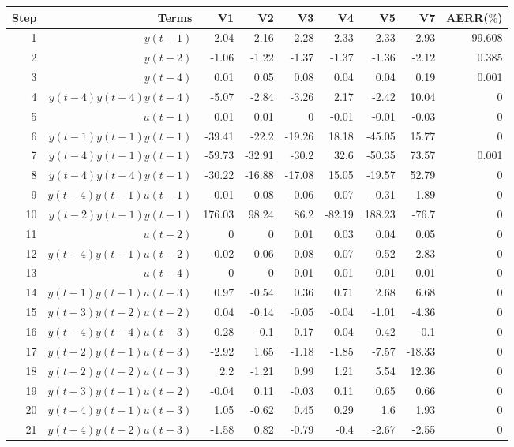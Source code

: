 \begin{tabular}{rrrrrrrrr}
Step & Terms & V1 & V2 & V3 & V4 & V5 & V7 & AERR($\%$) \\ 
\hline 
1 & $y(t-1)$ & 2.04 & 2.16 & 2.28 & 2.33 & 2.33 & 2.93 & 99.608 \\ 
2 & $y(t-2)$ & -1.06 & -1.22 & -1.37 & -1.37 & -1.36 & -2.12 & 0.385 \\ 
3 & $y(t-4)$ & 0.01 & 0.05 & 0.08 & 0.04 & 0.04 & 0.19 & 0.001 \\ 
4 & $y(t-4)y(t-4)y(t-4)$ & -5.07 & -2.84 & -3.26 & 2.17 & -2.42 & 10.04 & 0 \\ 
5 & $u(t-1)$ & 0.01 & 0.01 & 0 & -0.01 & -0.01 & -0.03 & 0 \\ 
6 & $y(t-1)y(t-1)y(t-1)$ & -39.41 & -22.2 & -19.26 & 18.18 & -45.05 & 15.77 & 0 \\ 
7 & $y(t-4)y(t-1)y(t-1)$ & -59.73 & -32.91 & -30.2 & 32.6 & -50.35 & 73.57 & 0.001 \\ 
8 & $y(t-4)y(t-4)y(t-1)$ & -30.22 & -16.88 & -17.08 & 15.05 & -19.57 & 52.79 & 0 \\ 
9 & $y(t-4)y(t-1)u(t-1)$ & -0.01 & -0.08 & -0.06 & 0.07 & -0.31 & -1.89 & 0 \\ 
10 & $y(t-2)y(t-1)y(t-1)$ & 176.03 & 98.24 & 86.2 & -82.19 & 188.23 & -76.7 & 0 \\ 
11 & $u(t-2)$ & 0 & 0 & 0.01 & 0.03 & 0.04 & 0.05 & 0 \\ 
12 & $y(t-4)y(t-1)u(t-2)$ & -0.02 & 0.06 & 0.08 & -0.07 & 0.52 & 2.83 & 0 \\ 
13 & $u(t-4)$ & 0 & 0 & 0.01 & 0.01 & 0.01 & -0.01 & 0 \\ 
14 & $y(t-1)y(t-1)u(t-3)$ & 0.97 & -0.54 & 0.36 & 0.71 & 2.68 & 6.68 & 0 \\ 
15 & $y(t-3)y(t-2)u(t-2)$ & 0.04 & -0.14 & -0.05 & -0.04 & -1.01 & -4.36 & 0 \\ 
16 & $y(t-4)y(t-4)u(t-3)$ & 0.28 & -0.1 & 0.17 & 0.04 & 0.42 & -0.1 & 0 \\ 
17 & $y(t-2)y(t-1)u(t-3)$ & -2.92 & 1.65 & -1.18 & -1.85 & -7.57 & -18.33 & 0 \\ 
18 & $y(t-2)y(t-2)u(t-3)$ & 2.2 & -1.21 & 0.99 & 1.21 & 5.54 & 12.36 & 0 \\ 
19 & $y(t-3)y(t-1)u(t-2)$ & -0.04 & 0.11 & -0.03 & 0.11 & 0.65 & 0.66 & 0 \\ 
20 & $y(t-4)y(t-1)u(t-3)$ & 1.05 & -0.62 & 0.45 & 0.29 & 1.6 & 1.93 & 0 \\ 
21 & $y(t-4)y(t-2)u(t-3)$ & -1.58 & 0.82 & -0.79 & -0.4 & -2.67 & -2.55 & 0 \\ 

\end{tabular}
